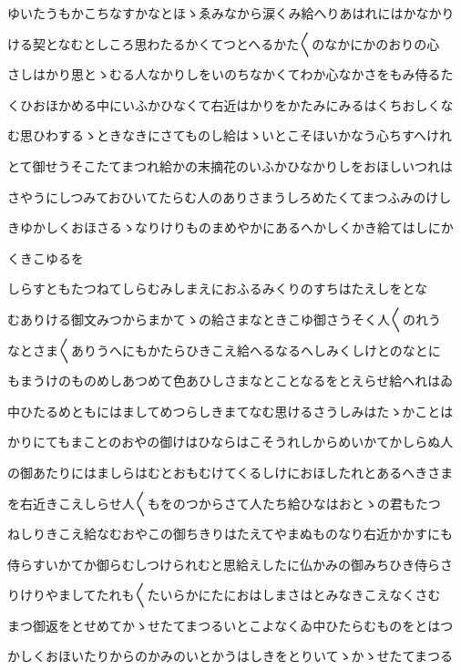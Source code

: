 \documentclass[a4paper,11pt,landscape]{ltjtarticle}
\begin{document}
ゆいたうもかこちなすかなとほゝゑみなから涙くみ給へりあはれにはかなかり
\par\medskip
ける契となむとしころ思わたるかくてつとへるかた〱のなかにかのおりの心
\par\medskip
さしはかり思とゝむる人なかりしをいのちなかくてわか心なかさをもみ侍るた
\par\medskip
くひおほかめる中にいふかひなくて右近はかりをかたみにみるはくちおしくな
\par\medskip
む思ひわするゝときなきにさてものし給はゝいとこそほいかなう心ちすへけれ
\par\medskip
とて御せうそこたてまつれ給かの末摘花のいふかひなかりしをおほしいつれは
\par\medskip
さやうにしつみておひいてたらむ人のありさまうしろめたくてまつふみのけし
\par\medskip
きゆかしくおほさるゝなりけりものまめやかにあるへかしくかき給てはしにか
\par\medskip
くきこゆるを
\par\medskip
しらすともたつねてしらむみしまえにおふるみくりのすちはたえしをとな
\par\medskip
むありける御文みつからまかてゝの給さまなときこゆ御さうそく人〱のれう
\par\medskip
なとさま〱ありうへにもかたらひきこえ給へるなるへしみくしけとのなとに
\par\medskip
もまうけのものめしあつめて色あひしさまなとことなるをとえらせ給へれはゐ
\par\medskip
中ひたるめともにはましてめつらしきまてなむ思けるさうしみはたゝかことは
\par\medskip
かりにてもまことのおやの御けはひならはこそうれしからめいかてかしらぬ人
\par\medskip
の御あたりにはましらはむとおもむけてくるしけにおほしたれとあるへきさま
\par\medskip
を右近きこえしらせ人〱もをのつからさて人たち給ひなはおとゝの君もたつ
\par\medskip
ねしりきこえ給なむおやこの御ちきりはたえてやまぬものなり右近かかすにも
\par\medskip
侍らすいかてか御らむしつけられむと思給えしたに仏かみの御みちひき侍らさ
\par\medskip
りけりやましてたれも〱たいらかにたにおはしまさはとみなきこえなくさむ
\par\medskip
まつ御返をとせめてかゝせたてまつるいとこよなくゐ中ひたらむものをとはつ
\par\medskip
かしくおほいたりからのかみのいとかうはしきをとりいてゝかゝせたてまつる
\end{document}
